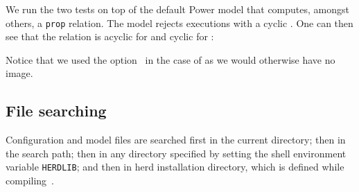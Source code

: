 We run the two tests on top of the default Power model that computes,
amongst others, a \texttt{prop} relation. The model rejects executions
with a cyclic .
One can then see that the relation  is acyclic
for  and cyclic for :
\begin{center}\quad\quad{}\end{center}
Notice that we used the option~ in the case
of  as we would otherwise have no image.


\subsection{\label{herd:searchpath}File searching}
Configuration and model files are searched first in the current directory;
then in the search path;
then in any directory specified
by setting the shell environment variable \texttt{HERDLIB};
and then in herd installation directory, which is defined
while compiling~\herd.

